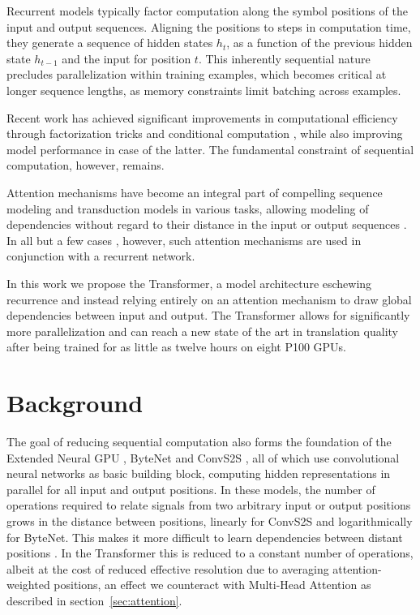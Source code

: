 \documentclass{article}
\begin{document}
Recurrent models typically factor computation along the symbol positions of the input and output sequences. Aligning the positions to steps in computation time, they generate a sequence of hidden states $h_t$, as a function of the previous hidden state $h_{t-1}$ and the input for position $t$. This inherently sequential nature precludes parallelization within training examples, which becomes critical at longer sequence lengths, as memory constraints limit batching across examples.

Recent work has achieved significant improvements in computational efficiency through factorization tricks \citep{Kuchaiev2017Factorization} and conditional computation \citep{shazeer2017outrageously}, while also improving model performance in case of the latter. The fundamental constraint of sequential computation, however, remains.

Attention mechanisms have become an integral part of compelling sequence modeling and transduction models in various tasks, allowing modeling of dependencies without regard to their distance in the input or output sequences \citep{bahdanau2014neural, structuredAttentionNetworks}. In all but a few cases \citep{decomposableAttnModel}, however, such attention mechanisms are used in conjunction with a recurrent network.

In this work we propose the Transformer, a model architecture eschewing recurrence and instead relying entirely on an attention mechanism to draw global dependencies between input and output. The Transformer allows for significantly more parallelization and can reach a new state of the art in translation quality after being trained for as little as twelve hours on eight P100 GPUs. 

\section{Background}

The goal of reducing sequential computation also forms the foundation of the Extended Neural GPU \citep{extendedngpu}, ByteNet \citep{NalBytenet2017} and ConvS2S \citep{JonasFaceNet2017}, all of which use convolutional neural networks as basic building block, computing hidden representations in parallel for all input and output positions. In these models, the number of operations required to relate signals from two arbitrary input or output positions grows in the distance between positions, linearly for ConvS2S and logarithmically for ByteNet. This makes it more difficult to learn dependencies between distant positions \citep{hochreiter2001gradient}. In the Transformer this is reduced to a constant number of operations, albeit at the cost of reduced effective resolution due to averaging attention-weighted positions, an effect we counteract with Multi-Head Attention as described in section~\ref{sec:attention}. 
\end{document}
